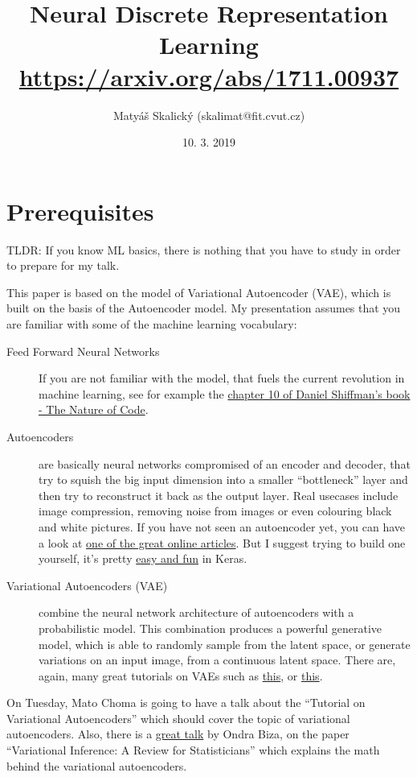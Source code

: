 \documentclass{article}
\title{%
  Neural Discrete Representation Learning\cite{van2017neural} \\
  \Large \href{https://arxiv.org/abs/1711.00937}{https://arxiv.org/abs/1711.00937}}
\author{Matyáš Skalický (skalimat@fit.cvut.cz)}
\date{\vspace{-1em}10. 3. 2019}
\begin{document}
\maketitle

\section*{Prerequisites}
TLDR: If you know ML basics, there is nothing that you have to study in order to prepare for my talk.

This paper is based on the model of Variational Autoencoder (VAE), which is built on the basis of the Autoencoder model. My presentation assumes that you are familiar with some of the machine learning vocabulary:
\begin{description}
    \item[Feed Forward Neural Networks] If you are not familiar with the model, that fuels the current revolution in machine learning, see for example the \href{https://natureofcode.com/book/chapter-10-neural-networks/}{chapter 10 of Daniel Shiffman's book - The Nature of Code}.
    \item[Autoencoders] are basically neural networks compromised of an encoder and decoder, that try to squish the big input dimension into a smaller ``bottleneck'' layer and then try to reconstruct it back as the output layer. Real usecases include image compression, removing noise from images or even colouring black and white pictures. If you have not seen an autoencoder yet, you can have a look at \href{https://towardsdatascience.com/applied-deep-learning-part-3-autoencoders-1c083af4d798}{one of the great online articles}. But I suggest trying to build one yourself, it's pretty \href{https://blog.keras.io/building-autoencoders-in-keras.html}{easy and fun} in Keras.
    \item[Variational Autoencoders (VAE)] combine the neural network architecture of autoencoders with a probabilistic model. This combination produces a powerful generative model, which is able to randomly sample from the latent space, or generate variations on an input image, from a continuous latent space. There are, again, many great tutorials on VAEs such as \href{https://jaan.io/what-is-variational-autoencoder-vae-tutorial/}{this}, or \href{https://towardsdatascience.com/intuitively-understanding-variational-autoencoders-1bfe67eb5daf}{this}.
\end{description}

On Tuesday, Mato Choma is going to have a talk about the ``Tutorial on Variational Autoencoders''\cite{doersch2016tutorial} which should cover the topic of variational autoencoders. Also, there is a \href{https://courses.fit.cvut.cz/BI-SZ1/talks/2019/03/handout.pdf}{great talk} by Ondra Biza, on the paper ``Variational Inference: A Review for Statisticians''\cite{blei2017variational} which explains the math behind the variational autoencoders.

{}

\end{document}

